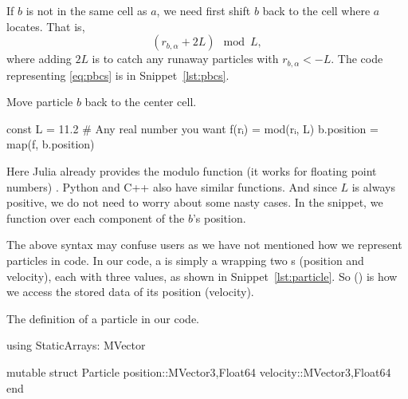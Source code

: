 If $b$ is not in the same cell as $a$, we need first shift $b$ back to the cell where
$a$ locates. That is,
%
\begin{equation}\label{eq:pbcs}
    (r_{b, \alpha} + 2L) \mod L,
\end{equation}
%
where adding $2L$ is to catch any runaway particles with $r_{b, \alpha} < -L$.
The code representing \eqref{eq:pbcs} is in Snippet~\ref{lst:pbcs}.
%
\begin{algorithm}
    \caption{Move particle $b$ back to the center cell.}
    \label{lst:pbcs}
    \begin{juliacode}
        const L = 11.2  # Any real number you want
        f(rᵢ) = mod(rᵢ, L)
        b.position = map(f, b.position)
    \end{juliacode}
\end{algorithm}
%
Here Julia already provides the modulo function (it works for floating point numbers)
\href{https://docs.julialang.org/en/v1/base/math/#Base.mod}{}. Python and C++
also have similar functions. And since $L$ is always positive, we do not need to worry
about some nasty cases.
In the snippet, we  function  over
each component of the $b$'s position.

The above syntax may confuse users as we have not mentioned how we represent particles in
code. In our code, a  is simply a  wrapping two
s (position and velocity), each with three  values, as shown in
Snippet~\ref{lst:particle}. So  () is how we access the
stored data of its position (velocity).

\begin{algorithm}
    \caption{The definition of a particle in our code.}
    \label{lst:particle}
    \begin{juliacode}
        using StaticArrays: MVector

        mutable struct Particle
            position::MVector{3,Float64}
            velocity::MVector{3,Float64}
        end
    \end{juliacode}
\end{algorithm}

